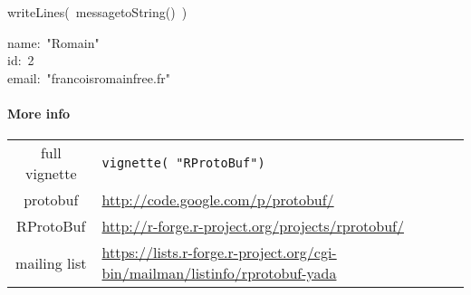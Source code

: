\documentclass[10pt,twocolumn,a4paper]{article}
\newenvironment{Hinput}%
{}%
{}%
\newenvironment{Houtput}%
{}%
{}%
\newenvironment{Hchunk}%
{\vspace{0.5em}\par\begin{flushleft}}%
{\end{flushleft}}%
\newcommand{\hlstd}[1]{\textcolor[rgb]{0,0,0}{#1}}%
\newcommand{\hlfunctioncall}[1]{\textcolor[rgb]{1,0,0}{#1}}%
\newcommand{\hlkeyword}[1]{\textcolor[rgb]{0,0,0}{#1}}%
\newcommand{\hlsymbol}[1]{\textcolor[rgb]{0,0,0}{#1}}%
\newcommand{\hlprompt}[1]{\textcolor[rgb]{0,0,0}{#1}}%
\begin{document}
\begin{Hchunk}
\begin{normalsize}
\begin{Hinput}

\ttfamily\noindent
\hlprompt{\usebox{\hlnormalsizeboxgreaterthan}{\ }}\hlfunctioncall{writeLines}\hlkeyword{(}{\ }\hlsymbol{message}\hlkeyword{\usebox{\hlnormalsizeboxdollar}}\hlfunctioncall{toString}\hlkeyword{(}\hlkeyword{)}{\ }\hlkeyword{)}\mbox{}
\normalfont

\end{Hinput}

\begin{Houtput}

\ttfamily\noindent
name:{\ }"{}Romain"{}\hspace*{\fill}\\
\hlstd{}id:{\ }2\hspace*{\fill}\\
\hlstd{}email:{\ }"{}francoisromain\usebox{\hlnormalsizeboxat}free.fr"{}\hspace*{\fill}\hlstd{}\mbox{}
\normalfont

\end{Houtput}

\end{normalsize}
\end{Hchunk}


\paragraph{More info}

\begin{center}
\begin{small}
\begin{tabular}{cp{7cm}}
full vignette & \verb|vignette( "RProtoBuf")| \\
protobuf & \url{http://code.google.com/p/protobuf/} \\
RProtoBuf & \url{http://r-forge.r-project.org/projects/rprotobuf/}\\
mailing list & \url{https://lists.r-forge.r-project.org/cgi-bin/mailman/listinfo/rprotobuf-yada} \\
\end{tabular}
\end{small}
\end{center}
\end{document}
